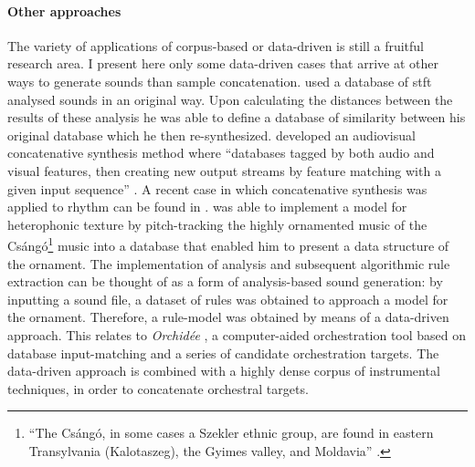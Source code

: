 	\paragraph{Other approaches}
	The variety of applications of corpus-based or data-driven is still a fruitful research area. I present here only some data-driven cases that arrive at other ways to generate sounds than sample concatenation. \textcite{icmc/bbp2372.2003.052} used a database of \gls{stft} analysed sounds in an original way. Upon calculating the distances between the results of these analysis he was able to define a database of similarity between his original database which he then re-synthesized. \textcite{DBLP:conf/icmc/Collins07} developed an audiovisual concatenative synthesis method where ``databases tagged by both audio and visual features, then creating new output streams by feature matching with a given input sequence'' \parencite[1]{DBLP:conf/icmc/Collins07}. A recent case in which concatenative synthesis was applied to rhythm can be found in \textcite{Nuannicode225in2016}. \textcite{icmc/bbp2372.2003.030} was able to implement a model for heterophonic texture by pitch-tracking the highly ornamented music of the Csángó\footnote{``The Csángó, in some cases a Szekler ethnic group, are found in eastern Transylvania (Kalotaszeg), the Gyimes valley, and Moldavia'' \parencite{icmc/bbp2372.2003.030}.} music into a database that enabled him to present a data structure of the ornament. The implementation of analysis and subsequent algorithmic rule extraction can be thought of as a form of analysis-based sound generation: by inputting a sound file, a dataset of rules was obtained to approach a model for the ornament. Therefore, a rule-model was obtained by means of a data-driven approach.	This relates to \textit{Orchidée} \parencite{gregoire_carpentier_2006_849343}, a computer-aided orchestration tool based on database input-matching and a series of candidate orchestration targets. The data-driven approach is combined with a highly dense corpus of instrumental techniques, in order to concatenate orchestral targets.

